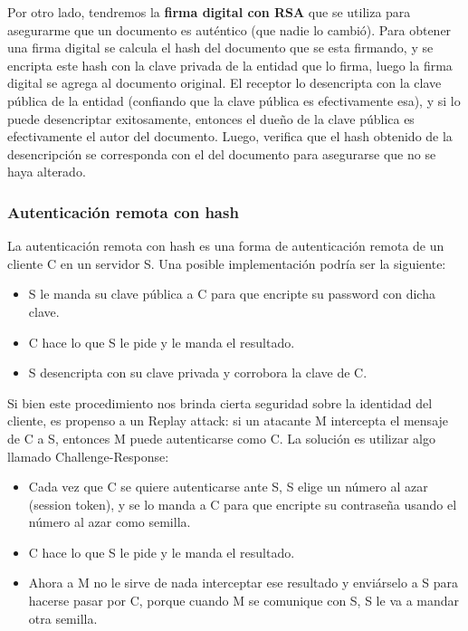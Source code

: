\documentclass{article}
\begin{document}
Por otro lado, tendremos la \textbf{firma digital con RSA} que se utiliza para asegurarme que un documento es auténtico (que nadie lo cambió). Para obtener una firma digital se calcula el hash del documento que se esta firmando, y se encripta este hash con la clave privada de la entidad que lo firma, luego la firma digital se agrega al documento original. El receptor lo desencripta con la clave pública de la entidad (confiando que la clave pública es efectivamente esa), y si lo puede desencriptar exitosamente, entonces el dueño de la clave pública es efectivamente el autor del documento. Luego, verifica que el hash obtenido de la desencripción se corresponda con el del documento para asegurarse que no se haya alterado.

\subsubsection{Autenticación remota con hash}

La autenticación remota con hash es una forma de autenticación remota de un cliente C en un servidor S. Una posible implementación podría ser la siguiente:
\begin{itemize}
 \item S le manda su clave pública a C para que encripte su password con dicha clave.
 \item C hace lo que S le pide y le manda el resultado.
 \item S desencripta con su clave privada y corrobora la clave de C.
\end{itemize}

Si bien este procedimiento nos brinda cierta seguridad sobre la identidad del cliente, es propenso a un Replay attack: si un atacante M intercepta el mensaje de C a S, entonces M puede autenticarse como C. La solución es utilizar algo llamado Challenge-Response:

\begin{itemize}
 \item Cada vez que C se quiere autenticarse ante S, S elige un número al azar (session token), y se lo manda a C para que encripte su contraseña usando el número al azar como semilla.
 \item C hace lo que S le pide y le manda el resultado.
 \item Ahora a M no le sirve de nada interceptar ese resultado y enviárselo a S para hacerse pasar por C, porque cuando M se comunique con S, S le va a mandar otra semilla.
\end{itemize}
\end{document}
